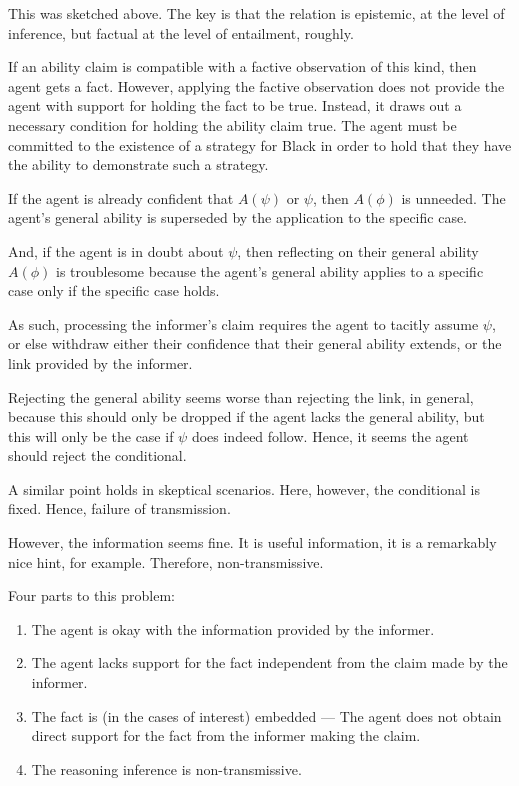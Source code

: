 \documentclass[10pt]{article}
\begin{document}
\begin{note}
  This was sketched above.
  The key is that the relation is epistemic, at the level of inference, but factual at the level of entailment, roughly.
\end{note}

If an ability claim is compatible with a factive observation of this kind, then agent gets a fact.
However, applying the factive observation does not provide the agent with support for holding the fact to be true.
Instead, it draws out a necessary condition for holding the ability claim true.
The agent must be committed to the existence of a strategy for Black in order to hold that they have the ability to demonstrate such a strategy.


\begin{note}
  If the agent is already confident that \(A(\psi)\) or \(\psi\), then \(A(\phi)\) is unneeded.
  The agent's general ability is superseded by the application to the specific case.

  And, if the agent is in doubt about \(\psi\), then reflecting on their general ability \(A(\phi)\) is troublesome because the agent's general ability applies to a specific case only if the specific case holds.

  As such, processing the informer's claim requires the agent to tacitly assume \(\psi\), or else withdraw either their confidence that their general ability extends, or the link provided by the informer.

  Rejecting the general ability seems worse than rejecting the link, in general, because this should only be dropped if the agent lacks the general ability, but this will only be the case if \(\psi\) does indeed follow.
  Hence, it seems the agent should reject the conditional.

  A similar point holds in skeptical scenarios.
  Here, however, the conditional is fixed.
  Hence, failure of transmission.

  However, the information seems fine.
  It is useful information, it is a remarkably nice hint, for example.
  Therefore, non-transmissive.
\end{note}

Four parts to this problem:
\begin{enumerate}[label=?\alph*., ref=(?\alph*)]
\item\label{prob:part:condit} The agent is okay with the information provided by the informer.
\item\label{prob:part:n-supp} The agent lacks support for the fact independent from the claim made by the informer.
\item\label{prob:part:embedd} The fact is (in the cases of interest) embedded --- The agent does not obtain direct support for the fact from the informer making the claim.
\item\label{prob:part:endors} The reasoning inference is non-transmissive.
\end{enumerate}
\end{document}
